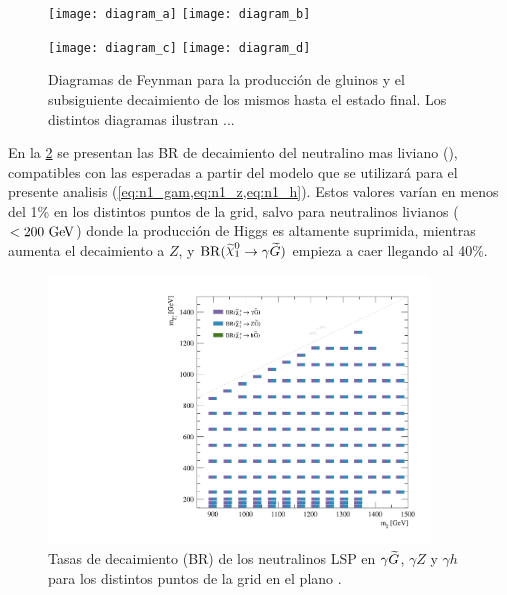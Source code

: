 \begin{figure}[!htb]
  \centering

  \texttt{[image: diagram\_a]}
  \texttt{[image: diagram\_b]}

  \texttt{[image: diagram\_c]}
  \texttt{[image: diagram\_d]}

  \caption{Diagramas de Feynman para la producción de gluinos y el subsiguiente
    decaimiento de los mismos hasta el estado final. Los distintos diagramas ilustran ... }
  \label{fig:signal_diagrams}

\end{figure}


En la \cref{fig:signal_br_n1} se presentan las BR de decaimiento del neutralino
mas liviano (\ninoone), compatibles con las esperadas a partir del modelo que se
utilizará para el presente analisis (\cref{eq:n1_gam,eq:n1_z,eq:n1_h}). Estos
valores varían en menos del 1\% en los distintos puntos de la grid, salvo para
neutralinos livianos ($<200\gev$) donde la producción de Higgs es altamente
suprimida, mientras aumenta el decaimiento a $Z$, y $\mathrm{BR}(\ninoone \to
\gam \gravino)$ empieza a caer llegando al 40\%.

\begin{figure}[!htb]
  \centering

  \includegraphics[width=0.9\textwidth]{figures/br_n1_X}

  \caption{Tasas de decaimiento (BR) de los neutralinos LSP en $\gamma\widetilde{G}$, $\gamma Z$ y
  $\gamma h$ para los distintos puntos de la grid en el plano \mgmn.}
  \label{fig:signal_br_n1}
\end{figure}





